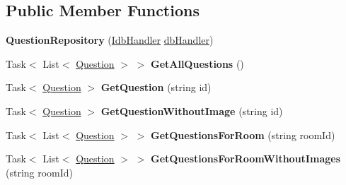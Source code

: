 \subsection*{Public Member Functions}
\begin{DoxyCompactItemize}
\item 
\hypertarget{class_wis_r_rest_a_p_i_1_1_domain_model_1_1_question_repository_ab741f635dfa8b735e626e989abb9f667}{}{\bfseries Question\+Repository} (\hyperlink{interface_wis_r_rest_a_p_i_1_1_domain_model_1_1_idb_handler}{Idb\+Handler} \hyperlink{class_wis_r_rest_a_p_i_1_1_domain_model_1_1db_handler}{db\+Handler})\label{class_wis_r_rest_a_p_i_1_1_domain_model_1_1_question_repository_ab741f635dfa8b735e626e989abb9f667}

\item 
\hypertarget{class_wis_r_rest_a_p_i_1_1_domain_model_1_1_question_repository_a5e9aab3a036c2382f7dfe2a02519fa94}{}Task$<$ List$<$ \hyperlink{class_wis_r_1_1_domain_models_1_1_question}{Question} $>$ $>$ {\bfseries Get\+All\+Questions} ()\label{class_wis_r_rest_a_p_i_1_1_domain_model_1_1_question_repository_a5e9aab3a036c2382f7dfe2a02519fa94}

\item 
\hypertarget{class_wis_r_rest_a_p_i_1_1_domain_model_1_1_question_repository_a48525ac31b4ef6888ba0cbd298664e55}{}Task$<$ \hyperlink{class_wis_r_1_1_domain_models_1_1_question}{Question} $>$ {\bfseries Get\+Question} (string id)\label{class_wis_r_rest_a_p_i_1_1_domain_model_1_1_question_repository_a48525ac31b4ef6888ba0cbd298664e55}

\item 
\hypertarget{class_wis_r_rest_a_p_i_1_1_domain_model_1_1_question_repository_a517cc9c8758fb356086d6c206bedd746}{}Task$<$ \hyperlink{class_wis_r_1_1_domain_models_1_1_question}{Question} $>$ {\bfseries Get\+Question\+Without\+Image} (string id)\label{class_wis_r_rest_a_p_i_1_1_domain_model_1_1_question_repository_a517cc9c8758fb356086d6c206bedd746}

\item 
\hypertarget{class_wis_r_rest_a_p_i_1_1_domain_model_1_1_question_repository_af204267cd06b16be95dde20a66179d2b}{}Task$<$ List$<$ \hyperlink{class_wis_r_1_1_domain_models_1_1_question}{Question} $>$ $>$ {\bfseries Get\+Questions\+For\+Room} (string room\+Id)\label{class_wis_r_rest_a_p_i_1_1_domain_model_1_1_question_repository_af204267cd06b16be95dde20a66179d2b}

\item 
\hypertarget{class_wis_r_rest_a_p_i_1_1_domain_model_1_1_question_repository_a84c9e548fa7a2e56cfca8bad46639321}{}Task$<$ List$<$ \hyperlink{class_wis_r_1_1_domain_models_1_1_question}{Question} $>$ $>$ {\bfseries Get\+Questions\+For\+Room\+Without\+Images} (string room\+Id)\label{class_wis_r_rest_a_p_i_1_1_domain_model_1_1_question_repository_a84c9e548fa7a2e56cfca8bad46639321}


\end{DoxyCompactItemize}
